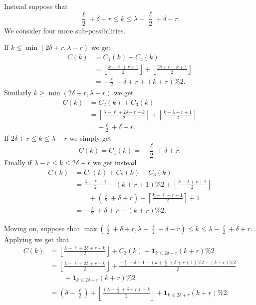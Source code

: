 \begin{enumerate}
\begin{itemize}
    \ii Instead suppose that
    \[ \frac{\ell}{2} + \delta + r \le k \le \lambda - \frac{\ell}{2} + \delta - r. \]
    We consider four more sub-possibilities.
    \begin{itemize}
    \ii If $k \le \min(2\delta+r, \lambda-r)$ we get
    \begin{align*}
      C(k) &= C_1(k) + C_4(k) \\
      &= \left\lfloor \frac{k-\ell+r+1}{2} \right\rfloor
      + \left\lfloor \frac{2\delta+r-k+1}{2} \right\rfloor \\
      &= -\frac{\ell}{2} + \delta + r + (k+r)\%2.
    \end{align*}
    \ii Similarly $k \ge \min(2\delta+r, \lambda-r)$ we get
    \begin{align*}
      C(k) &= C_2(k) + C_3(k) \\
      &= \left\lfloor \frac{\lambda - \ell + 2\delta + r - k}{2} \right\rfloor
      + \left\lfloor \frac{k-\lambda+r+1}{2} \right\rfloor \\
      &= -\frac{\ell}{2} + \delta + r.
    \end{align*}
    \ii If $2\delta + r \le k \le \lambda - r$ we simply get
    \[ C(k) = C_1(k) = -\frac{\ell}{2} + \delta + r. \]
    \ii Finally if $\lambda - r \le k \le 2 \delta + r$ we get instead
    \begin{align*}
      C(k) &= C_1(k) + C_2(k) + C_3(k) \\
      &= \frac{\lambda-\ell+1}{2} - (k+r+1)\%2
      + \left\lfloor \frac{k-\lambda+r+1}{2} \right\rfloor \\
      &\qquad + \left( \frac{\ell}{2} + \delta + r \right)- \left\lceil \frac{k+\ell+r+1}{2} \right\rceil + 1 \\
      &= -\frac{\ell}{2} + \delta + r + (k+r) \% 2.
    \end{align*}
    \end{itemize}
  \end{itemize}

  \ii Moving on, suppose that
  $\max(\frac{\ell}{2} + \delta + r, \lambda - \frac{\ell}{2} + \delta - r)
    \le k \le \lambda - \frac{\ell}{2} + \delta + r$.
  Applying  we get that
  \begin{align*}
    C(k) &= \left\lfloor \frac{\lambda - \ell + 2\delta + r - k}{2} \right\rfloor
    + C_3(k)
    + \mathbf{1}_{k \le 2 \delta + r} (k + r) \% 2 \\
    &= \left\lfloor \frac{\lambda - \ell + 2\delta + r - k}{2} \right\rfloor +
      \frac{- \frac{\ell}{2} + \delta + 1 - (k+\frac{\ell}{2}+\delta+r+1)\%2 -(k+r)\%2}{2} \\
      &\qquad + \mathbf{1}_{k \le 2 \delta + r} (k + r) \% 2 \\
    &= \left( \delta - \frac{\ell}{2} \right)
    + \left\lfloor \frac{\left( \lambda - \frac{\ell}{2} + \delta + r \right) - k}{2} \right\rfloor
    + \mathbf{1}_{k \le 2 \delta + r} (k + r) \% 2.
  \end{align*}


\end{enumerate}
